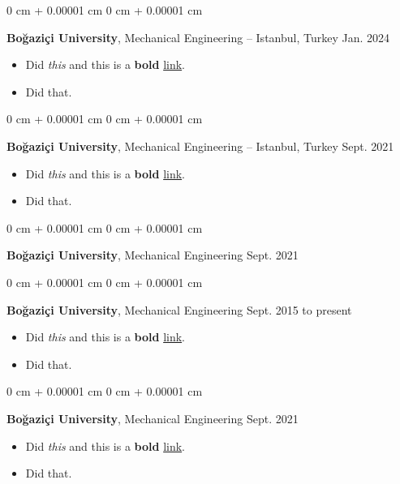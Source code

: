 \documentclass[10pt, letterpaper]{article}
\newenvironment{highlights}{
    \begin{itemize}[
        topsep=0.10 cm,
        parsep=0.10 cm,
        partopsep=0pt,
        itemsep=0pt,
        leftmargin=0 cm + 10pt
    ]
}{
    \end{itemize}
        
    \vspace{-0.20cm}
} %
\newenvironment{onecolentry}{
    \begin{adjustwidth}{
        0 cm + 0.00001 cm
    }{
        0 cm + 0.00001 cm
    }
}{
    \end{adjustwidth}
} %
\begin{document}
        \begin{onecolentry}
            \textbf{Boğaziçi University}, Mechanical Engineering -- Istanbul, Turkey \hfill Jan. 2024
            \begin{highlights}
                \item Did \textit{this} and this is a \textbf{bold} \href{https://example.com}{link}.
                \item Did that.
            \end{highlights}
        \end{onecolentry}

        \vspace{0.1 cm}

        \begin{onecolentry}
            \textbf{Boğaziçi University}, Mechanical Engineering -- Istanbul, Turkey \hfill Sept. 2021
            \begin{highlights}
                \item Did \textit{this} and this is a \textbf{bold} \href{https://example.com}{link}.
                \item Did that.
            \end{highlights}
        \end{onecolentry}

        \vspace{0.1 cm}

        \begin{onecolentry}
            \textbf{Boğaziçi University}, Mechanical Engineering \hfill Sept. 2021
        \end{onecolentry}

        \vspace{0.1 cm}

        \begin{onecolentry}
            \textbf{Boğaziçi University}, Mechanical Engineering \hfill Sept. 2015 to present
            \begin{highlights}
                \item Did \textit{this} and this is a \textbf{bold} \href{https://example.com}{link}.
                \item Did that.
            \end{highlights}
        \end{onecolentry}

        \vspace{0.1 cm}

        \begin{onecolentry}
            \textbf{Boğaziçi University}, Mechanical Engineering \hfill Sept. 2021
            \begin{highlights}
                \item Did \textit{this} and this is a \textbf{bold} \href{https://example.com}{link}.
                \item Did that.
            \end{highlights}
        \end{onecolentry}
\end{document}
